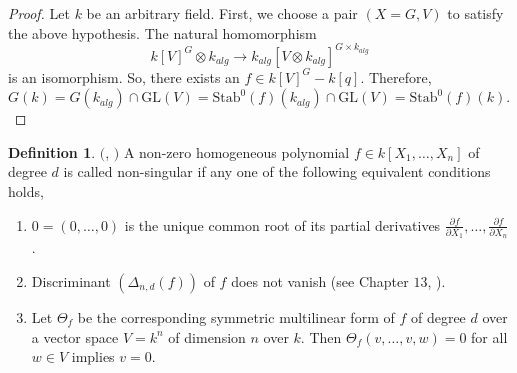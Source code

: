 \documentclass[12pt]{amsart}
\theoremstyle{definition}
\newtheorem{definition}[theorem]{Definition}
\numberwithin{equation}{section}
\begin{document}
\vskip2mm

\begin{proof}
Let $k$ be an arbitrary field. First, we choose a pair $(X=G, V)$ to satisfy the above hypothesis. The natural homomorphism \[k[V]^G\otimes k_{alg}\rightarrow k_{alg}[V\otimes k_{alg}]^{G\times k_{alg}}\] is an isomorphism. So, there exists an $f\in k[V]^G-k[q]$. Therefore, $G(k)=G(k_{alg})\cap \text{GL}(V)=\text{Stab}^{0}(f)(k_{alg})\cap \text{GL}(V)=\text{Stab}^{0}(f)(k).$
\end{proof}

\vskip2mm
\begin{definition}\label{Definition 5.30}
  $($\cite{OS}, \cite{Schneider}$)$  A non-zero homogeneous polynomial $f\in k[X_1,\dots, X_n]$ of degree $d$ is called non-singular if any one of the following equivalent conditions holds,
    \begin{enumerate}
        \item $0=(0,\dots,0)$ is the unique common root of its partial derivatives $\displaystyle\frac{\partial f}{\partial
        X_1},\dots,\displaystyle\frac{\partial f}{\partial X_n}$. 
        \vskip2mm
        \item Discriminant $(\Delta_{n,d}(f))$ of $f$ does not vanish (see Chapter $13$, \cite{GKZ}).
        \vskip2mm
        \item Let $\Theta_f$ be the corresponding symmetric multilinear form of $f$ of degree $d$ over a vector space $V=k^n$ of dimension $n$ over $k$. Then $\Theta_f(v,\dots,v,w)=0$ for all $w\in V$ implies $v=0$. 
    \end{enumerate}
\end{definition}
\end{document}
